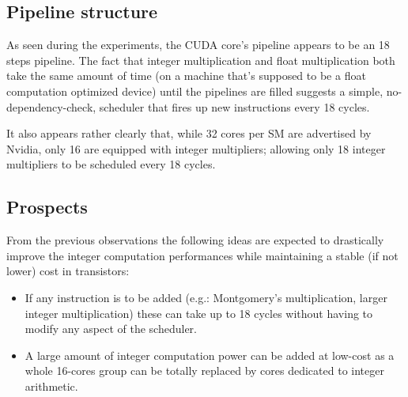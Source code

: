 \documentclass{report}
\begin{document}
    \subsection{Pipeline structure}
    As seen during the experiments, the CUDA core's pipeline appears to be an
    18 steps pipeline. The fact that integer multiplication and 
    float multiplication both take the same amount
    of time (on a machine that's supposed to be a float computation
    optimized device) until the pipelines are filled suggests a simple,
    no-dependency-check, scheduler that fires up new instructions every 18 cycles.

    It also appears rather clearly that, while 32 cores per SM are advertised by
    Nvidia, only 16 are equipped with integer multipliers; allowing only 18 integer
    multipliers to be scheduled every 18 cycles.
    
    \subsection{Prospects}
    From the previous observations the following ideas are expected to drastically
    improve the integer computation performances while maintaining a stable (if not
    lower) cost in transistors:
    \begin{itemize}
        \item If any instruction is to be added (e.g.: Montgomery's multiplication, larger integer multiplication) these can take up to 18 cycles without having to modify any aspect of the scheduler.
        \item A large amount of integer computation power can be added at low-cost as a whole 16-cores group can be totally replaced by cores dedicated to integer arithmetic.
    \end{itemize}
\end{document}
